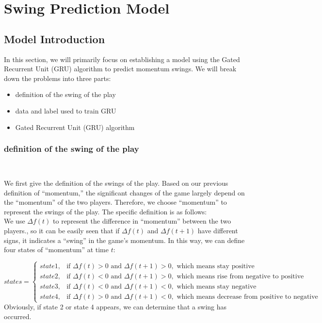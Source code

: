 \section{Swing Prediction Model}

\subsection{Model Introduction}

In this section, we will primarily focus on establishing a model using the Gated Recurrent Unit (GRU) algorithm to 
predict momentum swings. We will break down the problems into three parts:

\begin{itemize}
    \item definition of the swing of the play
    \item data and label used to train GRU
    \item Gated Recurrent Unit (GRU) algorithm
\end{itemize}

\subsubsection{definition of the swing of the play}~{}

We first give the definition of the swings of the play.
Based on our previous definition of ``momentum,'' the significant changes of the game 
largely depend on the ``momentum'' of the two players. Therefore, we choose ``momentum'' to represent 
the swings of the play. The specific definition is as follows:\\

We use $\Delta f(t)$ to represent the difference in ``momentum'' between the two players., 
so it can be easily seen that if $\Delta f(t)$ and $\Delta f(t+1)$
have different signs, it indicates a ``swing'' in the game's momentum. 
In this way, we can define four states of ``momentum'' at time $t$:

$$states=\begin{cases}
    state1, &\text{if } \Delta f(t)>0 \text{ and } \Delta f(t+1)>0, \text{ which means stay positive}\\
    state2, &\text{if } \Delta f(t)<0 \text{ and } \Delta f(t+1)>0, \text{ which means rise from negative to positive}\\
    state3, &\text{if } \Delta f(t)<0 \text{ and } \Delta f(t+1)<0, \text{ which means stay negative}\\
    state4, &\text{if } \Delta f(t)>0 \text{ and } \Delta f(t+1)<0, \text{ which means decrease from positive to negative}
\end{cases}$$
Obviously, if state 2 or state 4 appears, we can determine that a swing has occurred. 

